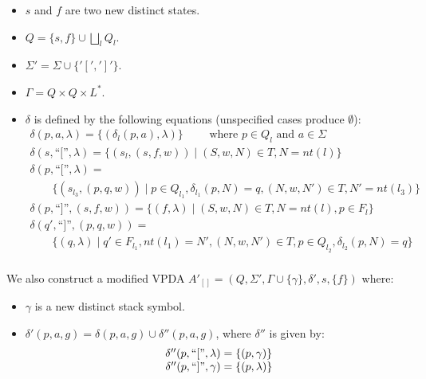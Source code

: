 \documentclass[runningheads]{llncs}
\newcommand{\T}{\Sigma} %
\newcommand{\Labels}{L} %
\newcommand{\pospl}{[}
\newcommand{\pospr}{]}
\newcommand{\posp}[1]{\pospl#1\pospr}
\newcommand{\labelnt}{\mathit{nt}} %
\begin{document}
\begin{itemize}
\item $s$ and $f$ are two new distinct states.
\item $Q = \{s, f\} \cup \bigsqcup_l Q_l$.
\item $\T' = \T \cup \{'\pospl', '\pospr'\}$.
\item $\Gamma = Q \times Q \times \Labels^{*}$.
\item $\delta$ is defined by the following equations (unspecified cases produce $\emptyset$):
  $$
  \begin{array}{l}
    \delta(p, a, \lambda) = \{(\delta_l(p, a), \lambda)\} \qquad \text{ where } p \in Q_l \text{ and } a \in \T \\

    \delta(s, \text{``}\pospl\text{''}, \lambda) =
    \{ (s_{l}, (s, f, w)) \mid
    (S, w, N) \in T, N = \labelnt(l) \} \\

    \delta(p, \text{``}\pospl\text{''}, \lambda) = \\
    \qquad\{ (s_{l_3}, (p, q, w)) \mid
    p \in Q_{l_1}, \delta_{l_1}(p, N) = q, (N, w, N') \in T, N' = \labelnt(l_3) \} \\

    \delta(p, \text{``}\pospr\text{''}, (s, f, w)) =
    \{ (f, \lambda) \mid
    (S, w, N) \in T, N = \labelnt(l), p \in F_l \} \\

    \delta(q', \text{``}\pospr\text{''}, (p, q, w)) = \\
    \qquad \{ (q, \lambda) \mid
    q' \in F_{l_1}, \labelnt(l_1) = N', (N, w, N') \in T, p \in Q_{l_2}, \delta_{l_2}(p, N) = q \} \\

  \end{array}
  $$
\end{itemize}

\noindent We also construct a modified VPDA $A'_{\posp{}} = (Q, \T', \Gamma \cup \{\gamma\}, \delta', s, \{f\})$ where:

\begin{itemize}
\item $\gamma$ is a new distinct stack symbol.
\item $\delta'(p, a, g) = \delta(p, a, g) \cup \delta''(p, a, g)$, where $\delta''$ is given by:
  $$
  \begin{array}{r@{\;=\;}l@{}}
    \delta''(p, \text{``}\pospl\text{''}, \lambda)
    & \{ (p, \gamma) \} \\

    \delta''(p, \text{``}\pospr\text{''}, \gamma)
    & \{ (p, \lambda) \} \\
  \end{array}
  $$
\end{itemize}
\end{document}
